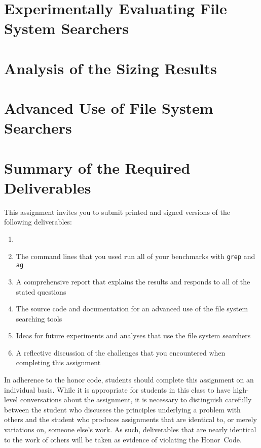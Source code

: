 \section*{Experimentally Evaluating File System Searchers}

\section*{Analysis of the Sizing Results}

\section*{Advanced Use of File System Searchers}

\section*{Summary of the Required Deliverables}

This assignment invites you to submit printed and signed versions of the following deliverables: 

\begin{enumerate}

  \item 

  \item The command lines that you used run all of your benchmarks with {\tt grep} and {\tt ag} 

  \item A comprehensive report that explains the results and responds to all of the stated questions 

  \item The source code and documentation for an advanced use of the file system searching tools

  \item Ideas for future experiments and analyses that use the file system searchers 

  \item A reflective discussion of the challenges that you encountered when completing this assignment

\end{enumerate}

In adherence to the honor code, students should complete this assignment on an individual basis. While it is appropriate
for students in this class to have high-level conversations about the assignment, it is necessary to distinguish
carefully between the student who discusses the principles underlying a problem with others and the student who produces
assignments that are identical to, or merely variations on, someone else's work.  As such, deliverables that are nearly
identical to the work of others will be taken as evidence of violating the \mbox{Honor Code}.  

  
